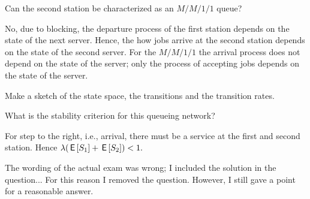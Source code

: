 
\begin{exercise}[201706]
  Can the second station be characterized as an $M/M/1/1$ queue? 
\begin{solution}
    No, due to blocking, the departure process of the first station depends on the state of the next server. Hence, the how  jobs arrive at the second station depends on the state of the second server. For the $M/M/1/1$ the arrival process does not depend on the state of the server; only the process of accepting jobs depends on the state of the server.  
\end{solution}
\end{exercise}


\begin{exercise}[201706]{2}
Make a sketch of the state space,  the transitions and the transition rates.
\begin{solution}
  \begin{center}
    
  \end{center}
\end{solution}
\end{exercise}

\begin{exercise}[201706]
What is the stability criterion for  this queueing network?
\begin{solution}
For step to the right, i.e., arrival, there must be a service at the first and second station. Hence $\lambda (\,\mathsf{E}\left[S_1\right] + \,\mathsf{E}\left[S_2\right] )  < 1.$ 

The wording of the actual exam was wrong; I included the solution in the question... For this reason I removed the question. However, I still gave a point for a reasonable answer. 
\end{solution}
\end{exercise}

